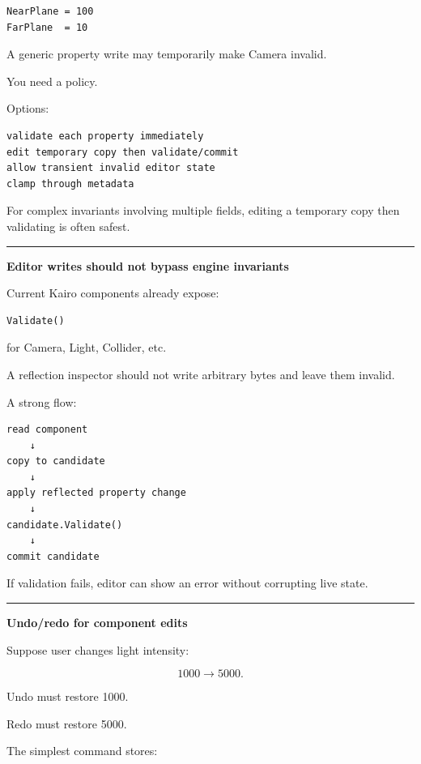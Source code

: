 \begin{verbatim}
NearPlane = 100
FarPlane  = 10
\end{verbatim}

A generic property write may temporarily make Camera invalid.

You need a policy.

Options:

\begin{verbatim}
validate each property immediately
edit temporary copy then validate/commit
allow transient invalid editor state
clamp through metadata
\end{verbatim}

For complex invariants involving multiple fields, editing a temporary copy then validating is often safest.

\begin{center}\rule{0.5\linewidth}{0.5pt}\end{center}

\textbf{Editor writes should not bypass engine invariants}

Current Kairo components already expose:

\begin{verbatim}
Validate()
\end{verbatim}

for Camera, Light, Collider, etc.

A reflection inspector should not write arbitrary bytes and leave them invalid.

A strong flow:

\begin{verbatim}
read component
    ↓
copy to candidate
    ↓
apply reflected property change
    ↓
candidate.Validate()
    ↓
commit candidate
\end{verbatim}

If validation fails, editor can show an error without corrupting live state.

\begin{center}\rule{0.5\linewidth}{0.5pt}\end{center}

\textbf{Undo/redo for component edits}

Suppose user changes light intensity:

\[
1000\rightarrow5000.
\]

Undo must restore 1000.

Redo must restore 5000.

The simplest command stores:

